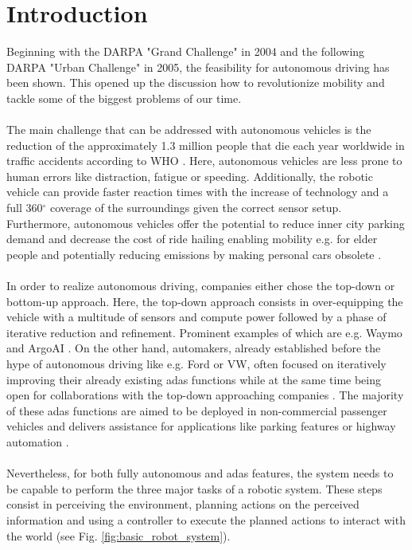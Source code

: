 \chapter{Introduction}
\label{ch:introduction}
Beginning with the DARPA "Grand Challenge" \cite{thrun2006stanley} in 2004 and the following DARPA "Urban Challenge" \cite{Urmson-2007-9708} in 2005, the feasibility for autonomous driving has been shown. This opened up the discussion how to revolutionize mobility and tackle some of the biggest problems of our time. 
\\\\
The main challenge that can be addressed with autonomous vehicles is the reduction of the approximately 1.3 million people that die each year worldwide in traffic accidents according to WHO \cite{world2018global}. Here, autonomous vehicles are less prone to human errors like distraction, fatigue or speeding. Additionally, the robotic vehicle can provide faster reaction times with the increase of technology and a full 360$^{\circ}$ coverage of the surroundings given the correct sensor setup. Furthermore, autonomous vehicles offer the potential to reduce inner city parking demand \cite{zhang2020impacts} and decrease the cost of ride hailing enabling mobility e.g. for elder people and potentially reducing emissions by making personal cars obsolete \cite{severino2021autonomous}.  
\\\\
In order to realize autonomous driving, companies either chose the top-down or bottom-up approach. Here, the top-down approach consists in over-equipping the vehicle with a multitude of sensors and compute power followed by a phase of iterative reduction and refinement. Prominent examples of which are e.g. Waymo \cite{sun2020scalability} and ArgoAI \cite{chang2019argoverse}. On the other hand, automakers, already established before the hype of autonomous driving like e.g. Ford or VW, often focused on iteratively improving their already existing \gls{adas} functions while at the same time being open for collaborations with the top-down approaching companies \cite{fordargovw2020}. The majority of these \gls{adas} functions are aimed to be deployed in non-commercial passenger vehicles and delivers assistance for applications like parking features \cite{fordvaletparking2021} or highway automation \cite{fordlanekeeping2021}.
\\\\
Nevertheless, for both fully autonomous and \gls{adas} features, the system needs to be capable to perform the three major tasks of a robotic system. These steps consist in perceiving the environment, planning actions on the perceived information and using a controller to execute the planned actions to interact with the world (see Fig. \ref{fig:basic_robot_system}).
